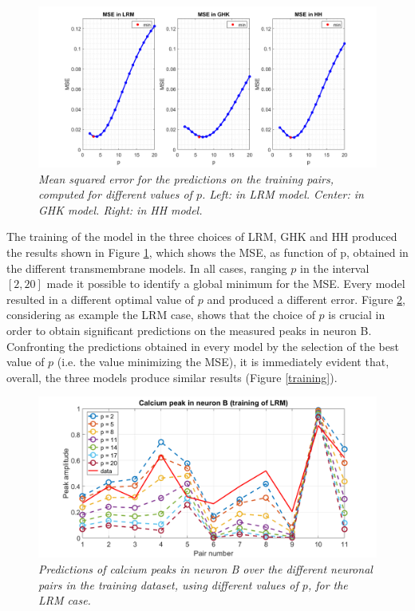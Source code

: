 \documentclass[12pt, a4paper]{report}
\begin{document}
\begin{figure}[H]
	\begin{center}
		\hspace*{-1.6 cm}
		\includegraphics[scale=0.5]{MSE.png} 
	\end{center} 
	\caption{\textit{Mean squared error for the predictions on the training pairs, computed for different values of $p$. Left: in LRM model. Center: in GHK model. Right: in HH model. }}
	\label{mse}
\end{figure}

The training of the model in the three choices of LRM, GHK and HH produced the results shown in Figure \ref{mse}, which shows the MSE, as function of p, obtained in the different transmembrane models. In all  cases, ranging $p$ in the interval $[2,20]$ made it possible to identify a global minimum for the MSE. Every model resulted in a different optimal value of $p$ and produced a different error. Figure \ref{training_LRM}, considering as example the LRM case, shows that the choice of $p$ is crucial in order to obtain significant predictions on the measured peaks in neuron B.\\ Confronting the predictions obtained in every model by the selection of the best value of $p$ (i.e. the value minimizing the MSE), it is immediately evident that, overall, the three models produce similar results  (Figure \ref{training}).
\begin{figure}[H]
	\begin{center}
		\hspace*{-1.5 cm}
		\includegraphics[scale=0.5]{training_LRM.png} 
	\end{center} 
	\caption{\textit{Predictions of calcium peaks in neuron B over the different neuronal pairs in the training dataset, using different values of $p$, for the LRM case.}}
	\label{training_LRM}
\end{figure}
\end{document}
